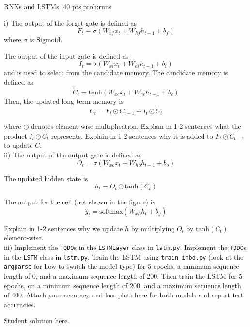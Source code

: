 \begin{problem}{RNNs and LSTMs \hfill [40 pts]}{prob:rnns}
\begin{adjustwidth}{2em}{2em}
\begin{adjustwidth}{2em}{2em}
    i) The output of the forget gate is defined as 
    $$F_t = \sigma(W_{xf}x_t + W_{hf}h_{t - 1} + b_f)$$
    where $\sigma$ is Sigmoid.
    
    The output of the input gate is defined as 
    $$I_t = \sigma(W_{xi}x_t + W_{hi}h_{t - 1} + b_i)$$
    and is used to select from the candidate memory. The candidate memory is defined as
    $$\tilde{C}_t = \text{tanh}(W_{xc}x_t + W_{hc}h_{t - 1} + b_c)$$
    Then, the updated long-term memory is
    $$C_t = F_t \odot C_{t - 1} + I_t \odot \tilde{C}_t$$
    
    where $\odot$ denotes element-wise multiplication. Explain in 1-2 sentences what the product $I_t \odot \tilde{C}_t$ represents. Explain in 1-2 sentences why it is added to $F_t \odot C_{t - 1}$ to update $C$. \\

    ii) The output of the output gate is defined as
    $$O_t = \sigma(W_{xo}x_t + W_{ho}h_{t - 1} + b_o)$$

    The updated hidden state is 
    $$h_t = O_t \odot \text{tanh}(C_t)$$

    The output for the cell (not shown in the figure) is
    $$\hat{y}_t = \text{softmax}(W_{xh}h_t + b_y)$$

    Explain in 1-2 sentences why we update $h$ by multiplying $O_t$ by $\text{tanh}(C_t)$ element-wise.
    \\

    iii) Implement the \texttt{TODO}s in the \texttt{LSTMLayer} class in \texttt{lstm.py}. Implement the \texttt{TODO}s in the \texttt{LSTM} class in \texttt{lstm.py}. Train the LSTM using \texttt{train\_imbd.py} (look at the \texttt{argparse} for how to switch the model type) for 5 epochs, a minimum sequence length of 0, and a maximum sequence length of 200. Then train the LSTM for 5 epochs, on a minimum sequence length of 200, and a maximum sequence length of 400. Attach your accuracy and loss plots here for both models and report test accuracies.
    
    \end{adjustwidth} 
    \vspace{5px}
\end{adjustwidth}

\end{problem}

\begin{solution*}{}{}
Student solution here.
\end{solution*}